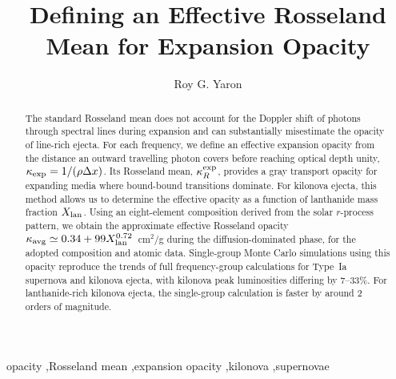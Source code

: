 \documentclass[final,5p,times,twocolumn]{elsarticle}
\begin{document}
\begin{frontmatter}


\author[1]{Roy G. Yaron}



\title{Defining an Effective Rosseland Mean for Expansion Opacity} %

\begin{abstract}
The standard Rosseland mean does not account for the Doppler shift of photons through spectral lines during expansion
and can substantially misestimate the opacity of line-rich ejecta.
For each frequency, we define an effective expansion opacity from the distance an outward
travelling photon covers before reaching optical depth unity,
$\kappa_{\rm exp}=1/(\rho\Delta x)$. Its Rosseland mean, $\kappa_R^{\rm exp}$, provides a gray
transport opacity for expanding media where bound-bound transitions dominate.
For kilonova ejecta, this method allows us to determine the effective opacity as a function of
lanthanide mass fraction $X_{\rm lan}$. Using an eight-element composition derived from the solar
$r$-process pattern, we obtain the approximate effective Rosseland opacity
$\kappa_{\rm avg}\simeq0.34+99X_{\rm lan}^{0.72}$~cm$^2$/g during the diffusion-dominated phase,
for the adopted composition and atomic data.
Single-group Monte Carlo simulations using this opacity reproduce the trends of full frequency-group
calculations for Type~Ia supernova and kilonova ejecta, with kilonova peak luminosities differing
by $7$--$33\%$. For lanthanide-rich kilonova ejecta, the single-group calculation is faster by around 2 
orders of magnitude.
\end{abstract}

\begin{keyword}

opacity \sep  Rosseland mean \sep expansion opacity  \sep kilonova \sep supernovae

\end{keyword}

\end{frontmatter}
\end{document}
